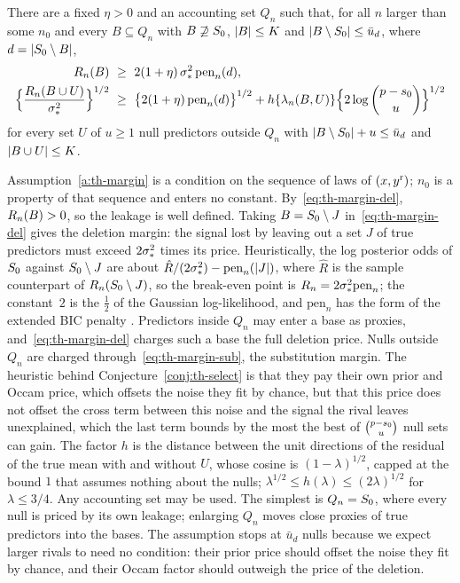 \begin{assumption}\label{a:th-margin}
There are a fixed $\eta>0$ and an accounting set $Q_n$ such that, for all $n$ larger than some $n_0$ and every
$B\subseteq Q_n$ with $B\not\supseteq S_0$, $\lvert B\rvert\le K$ and $\lvert B\setminus S_0\rvert\le\bar u_d$, where $d=\lvert S_0\setminus B\rvert$,
\begin{align}
  R_n(B)\ &\ge\ 2(1+\eta)\,\sigma_*^2\,\mathrm{pen}_n(d), \label{eq:th-margin-del}\\
  \Big\{\frac{R_n(B\cup U)}{\sigma_*^2}\Big\}^{1/2}
  \ &\ge\ \big\{2(1+\eta)\,\mathrm{pen}_n(d)\big\}^{1/2}
      +h\{\lambda_n(B,U)\}\Big\{2\log\binom{p-s_0}{u}\Big\}^{1/2} \label{eq:th-margin-sub}
\end{align}
for every set $U$ of $u\ge1$ null predictors outside $Q_n$ with $\lvert B\setminus S_0\rvert+u\le\bar u_d$ and
$\lvert B\cup U\rvert\le K$.
\end{assumption}

Assumption~\ref{a:th-margin} is a condition on the sequence of laws of $(x,y^{\mathrm r})$; $n_0$ is a property of that
sequence and enters no constant. By~\eqref{eq:th-margin-del}, $R_n(B)>0$, so the leakage is well defined. Taking
$B=S_0\setminus J$ in~\eqref{eq:th-margin-del} gives the deletion margin: the signal lost by leaving out a set $J$ of
true predictors must exceed $2\sigma_*^2$ times its price. Heuristically, the log posterior odds of $S_0$ against $S_0\setminus J$ are about
$\hat R/(2\sigma_*^2)-\mathrm{pen}_n(\lvert J\rvert)$, where $\hat R$ is the sample counterpart of $R_n(S_0\setminus J)$, so the
break-even point is $R_n=2\sigma_*^2\mathrm{pen}_n$; the constant~$2$ is the $\tfrac12$ of the Gaussian log-likelihood,
and $\mathrm{pen}_n$ has the form of the extended BIC penalty \citep{ChenChen2008}. Predictors inside $Q_n$ may enter
a base as proxies, and~\eqref{eq:th-margin-del} charges such a base the full deletion price. Nulls outside $Q_n$ are
charged through~\eqref{eq:th-margin-sub}, the substitution margin. The heuristic behind
Conjecture~\ref{conj:th-select} is that they pay their own prior and Occam price, which offsets the noise they fit by
chance, but that this price does not offset the cross term between this noise and the signal the
rival leaves unexplained, which the last term bounds by the most the best of $\binom{p-s_0}{u}$ null sets can gain. The
factor $h$ is the distance between the unit directions of the residual of the true mean with and without $U$, whose
cosine is $(1-\lambda)^{1/2}$, capped at the bound $1$ that assumes nothing about the nulls; $\lambda^{1/2}\le
h(\lambda)\le(2\lambda)^{1/2}$ for $\lambda\le3/4$. Any accounting set may be used. The simplest is $Q_n=S_0$, where
every null is priced by its own leakage; enlarging $Q_n$ moves close proxies of true predictors into the bases. The
assumption stops at $\bar u_d$ nulls because we expect larger rivals to need no condition: their prior price should
offset the noise they fit by chance, and their Occam factor should outweigh the price of the deletion.

